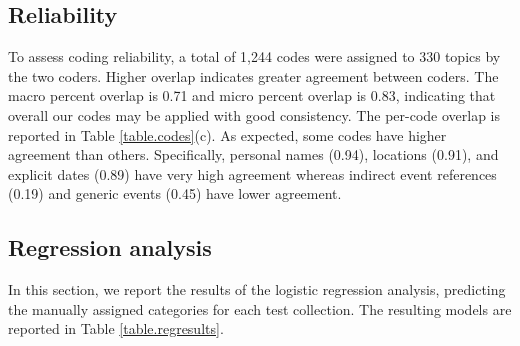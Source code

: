 \documentclass{sig-alternate-05-2015}
\begin{document}

\subsection{Reliability}

To assess coding reliability, a total of 1,244 codes were assigned to 330 topics by the two coders. Higher overlap indicates greater agreement between coders. The macro percent overlap is 0.71 and  micro percent overlap is 0.83, indicating that overall our codes may be applied with good consistency. The per-code overlap is reported in Table \ref{table.codes}(c). As expected, some codes have higher agreement than others. Specifically, personal names (0.94), locations (0.91), and explicit dates (0.89) have very high agreement whereas indirect event references (0.19) and generic events (0.45) have lower agreement.


\subsection{Regression analysis}

In this section, we report the results of the logistic regression analysis, predicting the manually assigned categories for each test collection. The resulting models are reported in Table \ref{table.regresults}. 
\end{document}
